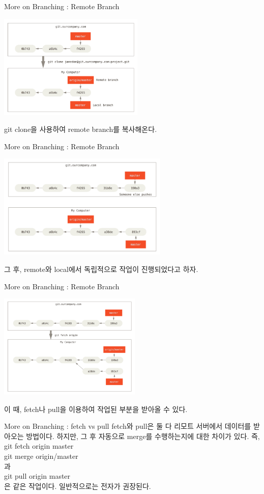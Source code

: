 \documentclass{beamer}
\begin{document}
\begin{frame}{More on Branching : Remote Branch}
\begin{center}
\includegraphics[height=5cm,keepaspectratio]{remote-branches-1} \\
\end{center}
git clone을 사용하여 remote branch를 복사해온다. 
\end{frame}

\begin{frame}{More on Branching : Remote Branch}
\begin{center}
\includegraphics[height=5cm,keepaspectratio]{remote-branches-2} \\
\end{center}
그 후, remote와 local에서 독립적으로 작업이 진행되었다고 하자.
\end{frame}


\begin{frame}{More on Branching : Remote Branch}
\begin{center}
\includegraphics[height=5cm,keepaspectratio]{remote-branches-3} \\ 
\end{center}
이 때, fetch나 pull을 이용하여 작업된 부분을 받아올 수 있다.
\end{frame}

 
\begin{frame}{More on Branching : fetch vs pull}
fetch와 pull은 둘 다 리모트 서버에서 데이터를 받아오는 방법이다. 하지만, 그 후 자동으로 merge를 수행하는지에 대한 차이가 있다. 즉, \\
git fetch origin master \\
git merge origin/master \\
과 \\
git pull origin master \\
은 같은 작업이다. 일반적으로는 전자가 권장된다. 
\end{frame}
\end{document}
